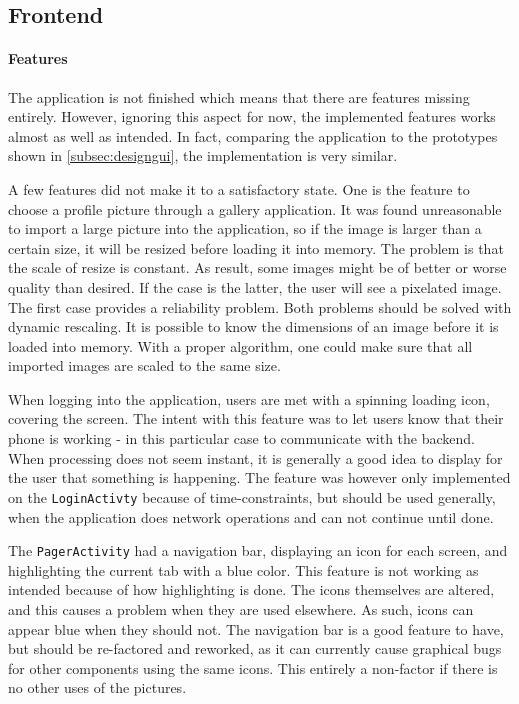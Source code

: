 \subsection{Frontend}
\label{subsec:frontend}

\paragraph{Features}
The application is not finished which means that there are features missing entirely. However, ignoring this aspect for now, the implemented features works almost as well as intended. In fact, comparing the application to the prototypes shown in \ref{subsec:designgui}, the implementation is very similar.

A few features did not make it to a satisfactory state. One is the feature to choose a profile picture through a gallery application. It was found unreasonable to import a large picture into the application, so if the image is larger than a certain size, it will be resized before loading it into memory. The problem is that the scale of resize is constant. As result, some images might be of better or worse quality than desired. If the case is the latter, the user will see a pixelated image. The first case provides a reliability problem.
Both problems should be solved with dynamic rescaling. It is possible to know the dimensions of an image before it is loaded into memory. With a proper algorithm, one could make sure that all imported images are scaled to the same size.

When logging into the application, users are met with a spinning loading icon, covering the screen. The intent with this feature was to let users know that their phone is working - in this particular case to communicate with the backend. When processing does not seem instant, it is generally a good idea to display for the user that something is happening.
The feature was however only implemented on the \texttt{LoginActivty} because of time-constraints, but should be used generally, when the application does network operations and can not continue until done.

The \texttt{PagerActivity} had a navigation bar, displaying an icon for each screen, and highlighting the current tab with a blue color. This feature is not working as intended because of how highlighting is done. The icons themselves are altered, and this causes a problem when they are used elsewhere. As such, icons can appear blue when they should not. The navigation bar is a good feature to have, but should be re-factored and reworked, as it can currently cause graphical bugs for other components using the same icons. This entirely a non-factor if there is no other uses of the pictures.

